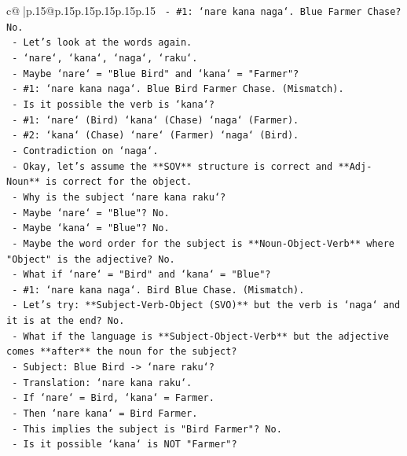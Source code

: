 \documentclass{article}
\begin{document}
{\begin{supertabular}{c@{$\;$}|p{.15\linewidth}@{}p{.15\linewidth}p{.15\linewidth}p{.15\linewidth}p{.15\linewidth}p{.15\linewidth}}
{{{\texttt{        {-} \#1: `nare kana naga`. Blue Farmer Chase? No.} \\
\texttt{    {-} Let's look at the words again.} \\
\texttt{      {-} `nare`, `kana`, `naga`, `raku`.} \\
\texttt{      {-} Maybe `nare` = "Blue Bird" and `kana` = "Farmer"?} \\
\texttt{        {-} \#1: `nare kana naga`. Blue Bird Farmer Chase. (Mismatch).} \\
\texttt{    {-} Is it possible the verb is `kana`?} \\
\texttt{      {-} \#1: `nare` (Bird) `kana` (Chase) `naga` (Farmer).} \\
\texttt{      {-} \#2: `kana` (Chase) `nare` (Farmer) `naga` (Bird).} \\
\texttt{        {-} Contradiction on `naga`.} \\
\texttt{    {-} Okay, let's assume the **SOV** structure is correct and **Adj{-}Noun** is correct for the object.} \\
\texttt{      {-} Why is the subject `nare kana raku`?} \\
\texttt{      {-} Maybe `nare` = "Blue"? No.} \\
\texttt{      {-} Maybe `kana` = "Blue"? No.} \\
\texttt{      {-} Maybe the word order for the subject is **Noun{-}Object{-}Verb** where "Object" is the adjective? No.} \\
\texttt{      {-} What if `nare` = "Bird" and `kana` = "Blue"?} \\
\texttt{        {-} \#1: `nare kana naga`. Bird Blue Chase. (Mismatch).} \\
\texttt{    {-} Let's try: **Subject{-}Verb{-}Object (SVO)** but the verb is `naga` and it is at the end? No.} \\
\texttt{    {-} What if the language is **Subject{-}Object{-}Verb** but the adjective comes **after** the noun for the subject?} \\
\texttt{      {-} Subject: Blue Bird {-}> `nare raku`?} \\
\texttt{      {-} Translation: `nare kana raku`.} \\
\texttt{      {-} If `nare` = Bird, `kana` = Farmer.} \\
\texttt{      {-} Then `nare kana` = Bird Farmer.} \\
\texttt{      {-} This implies the subject is "Bird Farmer"? No.} \\
\texttt{    {-} Is it possible `kana` is NOT "Farmer"?} \\
}}}
\end{supertabular}}
\end{document}
